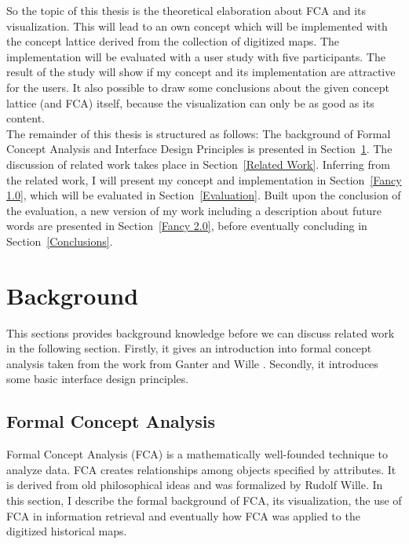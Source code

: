 \documentclass[11pt]{report}
\begin{document}
So the topic of this thesis is the theoretical elaboration about FCA and its visualization. This will lead to an own concept which will be implemented with the concept lattice derived from the collection of digitized maps. The implementation will be evaluated with a user study with five participants. The result of the study will show if my concept and its implementation are attractive for the users. It also possible to draw some conclusions about the given concept lattice (and FCA) itself, because the visualization can only be as good as its content.\\

 The remainder of this thesis is structured as follows: The background of Formal Concept Analysis and Interface Design Principles is presented in Section~\ref{Background}. The discussion of related work takes place in Section~\ref{Related Work}. Inferring from the related work, I will present my concept  and implementation in Section~\ref{Fancy 1.0}, which will  be evaluated in Section~\ref{Evaluation}. Built upon the conclusion of the evaluation, a new version of my work including a description about future words are presented in Section~\ref{Fancy 2.0}, before eventually concluding in Section~\ref{Conclusions}.
 
\chapter{Background}
\label{Background}

This sections provides background knowledge before we can discuss related work in the following section. Firstly, it gives an introduction into formal concept analysis taken from the work from Ganter and Wille \cite{Ganter2012}. Secondly, it introduces some basic interface design principles.

\section{Formal Concept Analysis}
\label{Formal Concept Analysis}

Formal Concept Analysis (FCA) is a mathematically well-founded technique to analyze data. FCA creates relationships among objects specified by attributes. It is derived from old philosophical ideas and was formalized by Rudolf Wille. In this section, I describe the formal background of FCA, its visualization, the use of FCA in information retrieval and eventually how FCA was applied to the digitized historical maps.
\end{document}
